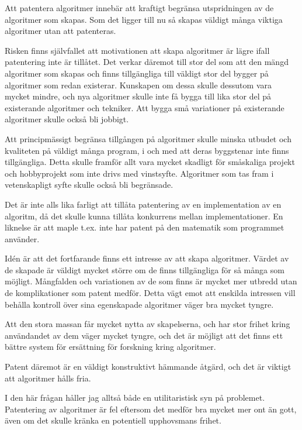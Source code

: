 \documentclass{article}
\begin{document}
Att patentera algoritmer innebär att kraftigt begränsa utspridningen av de algoritmer som skapas. Som det ligger till nu så skapas väldigt många viktiga algoritmer utan att patenteras.

Risken finns självfallet att motivationen att skapa algoritmer är lägre ifall patentering inte är tillåtet. Det verkar däremot till stor del som att den mängd algoritmer som skapas och finns tillgängliga till väldigt stor del bygger på algoritmer som redan existerar. Kunskapen om dessa skulle dessutom vara mycket mindre, och nya algoritmer skulle inte få bygga till lika stor del på existerande algoritmer och tekniker. Att bygga små variationer på existerande algoritmer skulle också bli jobbigt.

Att principmässigt begränsa tillgången på algoritmer skulle minska utbudet och kvaliteten på väldigt många program, i och med att deras byggstenar inte finns tillgängliga. Detta skulle framför allt vara mycket skadligt för småskaliga projekt och hobbyprojekt som inte drivs med vinstsyfte. Algoritmer som tas fram i vetenskapligt syfte skulle också bli begränsade.

Det är inte alls lika farligt att tillåta patentering av en implementation av en algoritm, då det skulle kunna tillåta konkurrens mellan implementationer. En liknelse är att maple t.ex. inte har patent på den matematik som programmet använder.

Idén är att det fortfarande finns ett intresse av att skapa algoritmer. Värdet av de skapade är väldigt mycket större om de finns tillgängliga för så många som möjligt. Mångfalden och variationen av de som finns är mycket mer utbredd utan de komplikationer som patent medför. Detta vägt emot att enskilda intressen vill behålla kontroll över sina egenskapade algoritmer väger bra mycket tyngre.

Att den stora massan får mycket nytta av skapelserna, och har stor frihet kring användandet av dem väger mycket tyngre, och det är möjligt att det finns ett bättre system för ersättning för forskning kring algoritmer.

Patent däremot är en väldigt konstruktivt hämmande åtgärd, och det är viktigt att algoritmer hålls fria.

I den här frågan håller jag alltså både en utilitaristisk syn på problemet. Patentering av algoritmer är fel eftersom det medför bra mycket mer ont än gott, även om det skulle kränka en potentiell upphovsmans frihet.
\end{document}

